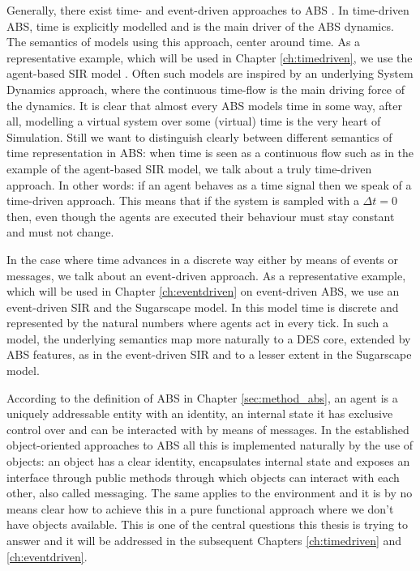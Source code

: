 Generally, there exist time- and event-driven approaches to ABS \cite{meyer_event-driven_2014}. In time-driven ABS, time is explicitly modelled and is the main driver of the ABS dynamics. The semantics of models using this approach, center around time. As a representative example, which will be used in Chapter \ref{ch:timedriven}, we use the agent-based SIR model \cite{macal_agent-based_2010, thaler_pure_2018}. Often such models are inspired by an underlying System Dynamics approach, where the continuous time-flow is the main driving force of the dynamics. It is clear that almost every ABS models time in some way, after all, modelling a virtual system over some (virtual) time is the very heart of Simulation. Still we want to distinguish clearly between different semantics of time representation in ABS: when time is seen as a continuous flow such as in the example of the agent-based SIR model, we talk about a truly time-driven approach. In other words: if an agent behaves as a time signal then we speak of a time-driven approach. This means that if the system is sampled with a $\Delta t = 0$ then, even though the agents are executed their behaviour must stay constant and must not change.

In the case where time advances in a discrete way either by means of events or messages, we talk about an event-driven approach. As a representative example, which will be used in Chapter \ref{ch:eventdriven} on event-driven ABS, we use an event-driven SIR and the Sugarscape model. In this model time is discrete and represented by the natural numbers where agents act in every tick. In such a model, the underlying semantics map more naturally to a DES core, extended by ABS features, as in the event-driven SIR and to a lesser extent in the Sugarscape model.

According to the definition of ABS in  Chapter \ref{sec:method_abs}, an agent is a uniquely addressable entity with an identity, an internal state it has exclusive control over and can be interacted with by means of messages. In the established object-oriented approaches to ABS all this is implemented naturally by the use of objects: an object has a clear identity, encapsulates internal state and exposes an interface through public methods through which objects can interact with each other, also called messaging. The same applies to the environment and it is by no means clear how to achieve this in a pure functional approach where we don't have objects available. This is one of the central questions this thesis is trying to answer and it will be addressed in the subsequent Chapters \ref{ch:timedriven} and \ref{ch:eventdriven}.

